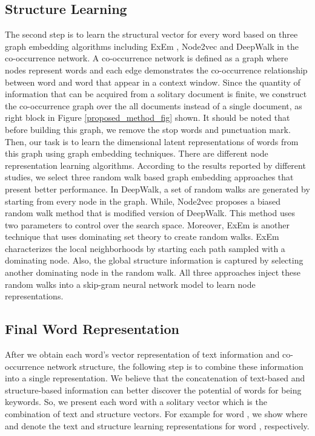 \documentclass[review,3p]{elsarticle}
\begin{document}
\subsection{Structure Learning} \label{III-C}
The second step is to learn the structural vector for every word based on three graph embedding algorithms including ExEm \cite{nikzad2020exem} , Node2vec \cite{Grover2016} and DeepWalk \cite{Perozzi2014} in the co-occurrence network. A co-occurrence network is defined as a graph  where nodes represent words and  each edge  demonstrates the co-occurrence relationship between word  and word  that appear in a context window. Since the quantity of information that can be acquired from a solitary document is finite, we construct the co-occurrence graph over the all documents instead of a single document, as right block in Figure \ref{proposed_method_fig} shown. It should be noted that before building this graph, we remove the stop words and punctuation mark. Then,  our task is to learn the dimensional latent representations of words from this graph using graph embedding techniques. There are different node representation learning algorithms. According to the results reported by different studies, we select three random walk based graph embedding approaches that present better performance. In DeepWalk, a set of random walks are generated by starting from every node in the graph. While, Node2vec proposes a biased random walk method that is modified version of DeepWalk. This method uses two parameters to control over the search space. Moreover, ExEm is another technique that uses dominating set theory to create random walks. ExEm characterizes the local neighborhoods by starting each path sampled with a dominating node. Also, the global structure information is captured by selecting another dominating node in the random walk. All three approaches inject these random walks into a skip-gram neural network model to learn node representations. 

\subsection{Final Word Representation}
After we obtain each word's vector representation of text information and co-occurrence network structure, the following step is to combine these information into a single representation. We believe that the concatenation of text-based and structure-based information can better discover the potential of words for being keywords. So, we present each word with a solitary vector which is the combination of text and structure vectors. For example for word , we show  where  and  denote the text and structure learning representations for word , respectively.
\end{document}

